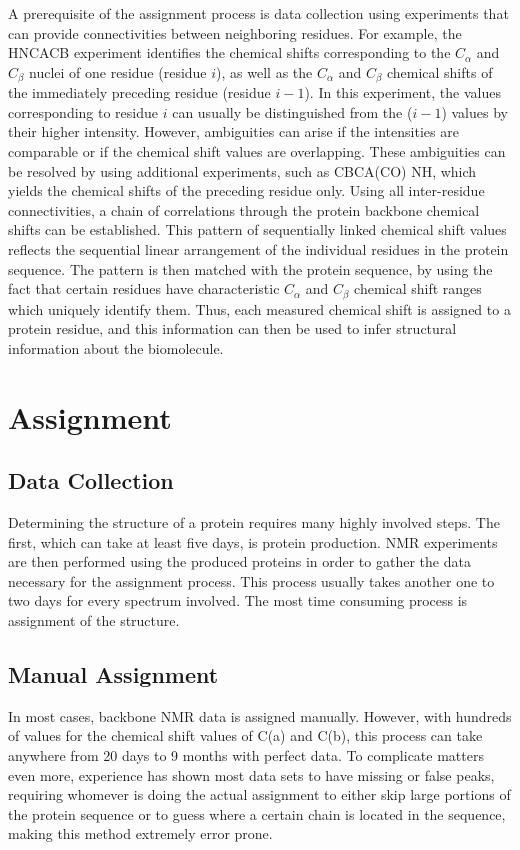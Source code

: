 \documentclass[12pt]{article}
\begin{document}
A prerequisite of the assignment process is data collection using experiments that can provide connectivities between neighboring residues. For example, the HNCACB experiment identifies the chemical shifts corresponding to the $C_\alpha$ and $C_{\beta}$ nuclei of one residue (residue $i$), as well as the $C_\alpha$ and $C_{\beta}$ chemical shifts of the immediately preceding residue (residue $i -1$). In this experiment, the values corresponding to residue $i$ can usually be distinguished from the ($i -1$) values by their higher intensity. However, ambiguities can arise if the intensities are comparable or if the chemical shift values are overlapping. These ambiguities can be resolved by using additional experiments, such as CBCA(CO) NH, which yields the chemical shifts of the preceding residue only. Using all inter-residue connectivities, a chain of correlations through the protein backbone chemical shifts can be established.  This pattern of sequentially linked chemical shift values reflects the sequential linear arrangement of the individual residues in the protein sequence. The pattern is then matched with the protein sequence, by using the fact that certain residues have characteristic $C_\alpha$ and $C_{\beta}$ chemical shift ranges which uniquely identify them. Thus, each measured chemical shift is assigned to a protein residue, and this information can then be used to infer structural information about the biomolecule.

\section{Assignment} %
\label{sec:method}

\subsection{Data Collection} %
\label{sub:data_collection}
Determining the structure of a protein requires many highly involved steps. The first, which can take at least five days, is protein production. NMR experiments are then performed using the produced proteins in order to gather the data necessary for the assignment process. This process usually takes another one to two days for every spectrum involved. The most time consuming process is assignment of the structure. \cite{babak_alipanahi_error_2011}

\subsection{Manual Assignment} %
\label{sub:manual_assignment}
In most cases, backbone NMR data is assigned manually. However, with hundreds of values for the chemical shift values of C(a) and C(b), this process can take anywhere from 20 days to 9 months with perfect data. To complicate matters even more, experience has shown most data sets to have missing or false peaks, requiring whomever is doing the actual assignment to either skip large portions of the protein sequence or to guess where a certain chain is located in the sequence, making this method extremely error prone. \cite{babak_alipanahi_error_2011}
\end{document}
